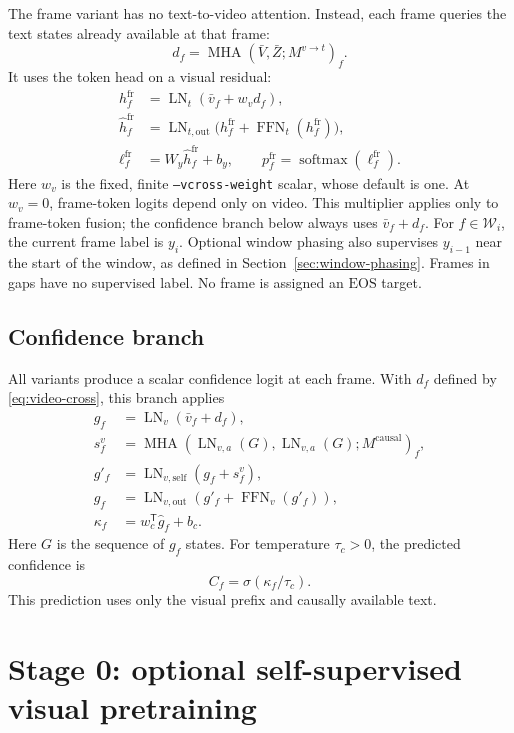 \documentclass[11pt,a4paper]{article}
\newcommand{\LN}{\operatorname{LN}}
\newcommand{\MHA}{\operatorname{MHA}}
\newcommand{\FFN}{\operatorname{FFN}}
\newcommand{\softmax}{\operatorname{softmax}}
\newcommand{\EOS}{\mathrm{EOS}}
\numberwithin{equation}{section}
\begin{document}
The frame variant has no text-to-video attention. Instead, each frame
queries the text states already available at that frame:
\begin{equation}
d_f=\MHA(\bar V,\bar Z;M^{v\to t})_f.
\label{eq:video-cross}
\end{equation}
It uses the token head on a visual residual:
\begin{align}
h_f^{\mathrm{fr}}&=\LN_t(\bar v_f+w_vd_f),\\
\widehat h_f^{\mathrm{fr}}
 &=\LN_{t,\mathrm{out}}\bigl(h_f^{\mathrm{fr}}+\FFN_t(h_f^{\mathrm{fr}})\bigr),\\
\ell_f^{\mathrm{fr}}&=W_y\widehat h_f^{\mathrm{fr}}+b_y,
\qquad p_f^{\mathrm{fr}}=\softmax(\ell_f^{\mathrm{fr}}).
\end{align}
Here $w_v$ is the fixed, finite \texttt{--vcross-weight} scalar, whose
default is one. At $w_v=0$, frame-token logits depend only on video.
This multiplier applies only to frame-token fusion; the confidence
branch below always uses $\bar v_f+d_f$.
For $f\in\mathcal W_i$, the current frame label is $y_i$.
Optional window phasing also supervises $y_{i-1}$ near the start of
the window, as defined in Section~\ref{sec:window-phasing}.
Frames in gaps have no supervised label. No frame is assigned an
$\EOS$ target.

\subsection{Confidence branch}

All variants produce a scalar confidence logit at each frame. With
$d_f$ defined by \eqref{eq:video-cross}, this branch applies
\begin{align}
g_f&=\LN_v(\bar v_f+d_f),\\
s_f^{v}&=\MHA(\LN_{v,a}(G),\LN_{v,a}(G);M^{\mathrm{causal}})_f,\\
g'_f&=\LN_{v,\mathrm{self}}(g_f+s_f^{v}),\\
\widehat g_f&=\LN_{v,\mathrm{out}}(g'_f+\FFN_v(g'_f)),\\
\kappa_f&=w_c^{\mathsf T}\widehat g_f+b_c.
\label{eq:confidence-head}
\end{align}
Here $G$ is the sequence of $g_f$ states. For temperature $\tau_c>0$,
the predicted confidence is
\begin{equation}
C_f=\sigma(\kappa_f/\tau_c).
\end{equation}
This prediction uses only the visual prefix and causally available text.

\section{Stage 0: optional self-supervised visual pretraining}
\label{sec:pretraining}
\end{document}
